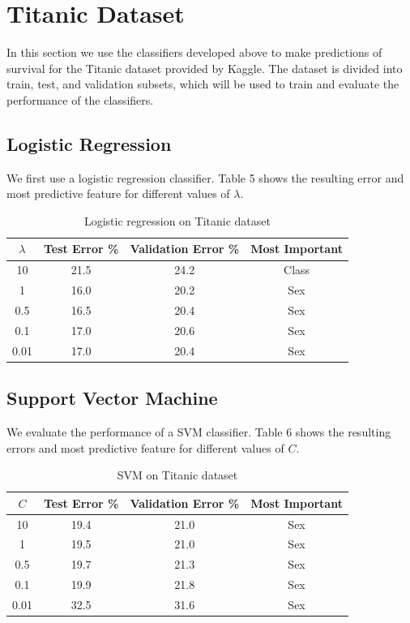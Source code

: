 \documentclass[10pt,twocolumn]{article}
\begin{document}
\section{Titanic Dataset}

In this section we use the classifiers developed above to make predictions of survival for the Titanic dataset provided by Kaggle. The dataset is divided into train, test, and validation subsets, which will be used to train and evaluate the performance of the classifiers.

\subsection*{Logistic Regression}

We first use a logistic regression classifier. Table 5 shows the resulting error and most predictive feature for different values of $\lambda$.

\begin{table}
 \caption{Logistic regression on Titanic dataset}
  \begin{tabular}{ | c | c | c | c |}
 \hline
 $\lambda$ & Test Error \% & Validation Error \% & Most Important  \\ \hline 
 10 & 21.5 & 24.2 & Class  \\ \hline
 1 & 16.0 & 20.2 & Sex  \\ \hline
 0.5 & 16.5 & 20.4 & Sex \\ \hline
 0.1 & 17.0 & 20.6 & Sex \\ \hline 
 0.01 & 17.0 & 20.4 & Sex \\ \hline
 \end{tabular}
 \label{SVM C1 T}
\end{table}
      
\subsection*{Support Vector Machine}

We evaluate the performance of a SVM classifier. Table 6 shows the resulting errors and most predictive feature for different values of $C$.

\begin{table}
 \caption{SVM on Titanic dataset}
  \begin{tabular}{ | c | c | c | c |}
 \hline
 $C$ & Test Error \% & Validation Error \% & Most Important  \\ \hline 
 10 &  19.4 & 21.0 &  Sex \\ \hline
 1 & 19.5 & 21.0 & Sex  \\ \hline
 0.5 & 19.7 & 21.3 & Sex \\ \hline
 0.1 & 19.9 & 21.8 & Sex  \\ \hline 
 0.01 & 32.5 & 31.6 & Sex \\ \hline
 \end{tabular}
 \label{SVM C1 T}
\end{table}
\end{document}
